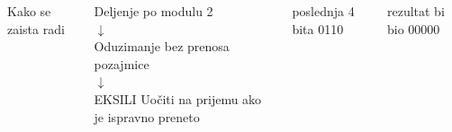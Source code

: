 \begin{frame}[label=06-s025]
\fontsize{10}{12}\selectfont\begin{columns}[c,onlytextwidth]
\centering Kako se zaista radi\par\vspace{7mm}
Deljenje po modulu 2\\\textcolor{DEcrvena}{$\downarrow$}\\Oduzimanje bez prenosa pozajmice\\\textcolor{DEcrvena}{$\downarrow$}\\EKSILI
{}\centering
{}Uočiti na prijemu ako je ispravno preneto\par\vspace{4mm}
poslednja 4 bita 0110\par\vspace{4mm}rezultat bi bio 00000
\end{columns}
\end{frame}
